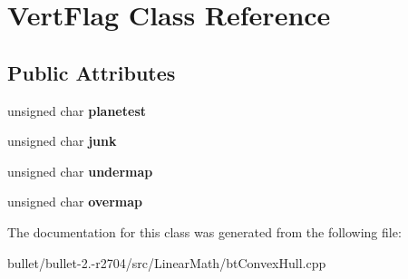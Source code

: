 \hypertarget{class_vert_flag}{\section{Vert\+Flag Class Reference}
\label{class_vert_flag}
}
\subsection*{Public Attributes}
\begin{DoxyCompactItemize}
\item 
\hypertarget{class_vert_flag_afb68cbf59355c7f55a3c838e3cea9acb}{unsigned char {\bfseries planetest}}\label{class_vert_flag_afb68cbf59355c7f55a3c838e3cea9acb}

\item 
\hypertarget{class_vert_flag_a4b4586a5ab224c9e1bd9510a1cb33bf5}{unsigned char {\bfseries junk}}\label{class_vert_flag_a4b4586a5ab224c9e1bd9510a1cb33bf5}

\item 
\hypertarget{class_vert_flag_a5fa870fd2c86733247f5f5a05a2fc846}{unsigned char {\bfseries undermap}}\label{class_vert_flag_a5fa870fd2c86733247f5f5a05a2fc846}

\item 
\hypertarget{class_vert_flag_a9f27902db81631794f6a7560b2999a5b}{unsigned char {\bfseries overmap}}\label{class_vert_flag_a9f27902db81631794f6a7560b2999a5b}

\end{DoxyCompactItemize}


The documentation for this class was generated from the following file\+:\begin{DoxyCompactItemize}
\item 
bullet/bullet-\/2.-\/r2704/src/\+Linear\+Math/bt\+Convex\+Hull.\+cpp\end{DoxyCompactItemize}
